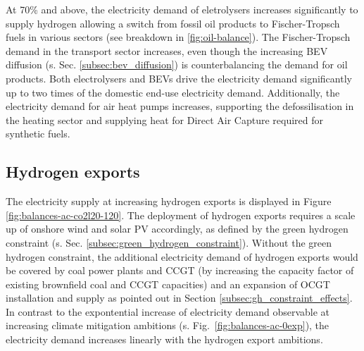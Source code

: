 At 70\% and above, the electricity demand of eletrolysers increases significantly to supply hydrogen allowing a switch from fossil oil products to Fischer-Tropsch fuels in various sectors (see breakdown in \ref{fig:oil-balance}). 
The Fischer-Tropsch demand in the transport sector increases, even though the increasing BEV diffusion (s. Sec. \ref{subsec:bev_diffusion}) is counterbalancing the demand for oil products. 
Both electrolysers and BEVs drive the electricity demand significantly up to two times of the domestic end-use electricity demand. 
Additionally, the electricity demand for air heat pumps increases, supporting the defossilisation in the heating sector and supplying heat for Direct Air Capture required for synthetic fuels.



\subsection{Hydrogen exports}
\label{subsec:increase_h2}

The electricity supply at increasing hydrogen exports is displayed in Figure \ref{fig:balances-ac-co2l20-120}. The deployment of hydrogen exports requires a scale up of onshore wind and solar PV accordingly, as defined by the green hydrogen constraint (s. Sec. \ref{subsec:green_hydrogen_constraint}).
Without the green hydrogen constraint, the additional electricity demand of hydrogen exports would be covered by coal power plants and CCGT (by increasing the capacity factor of existing brownfield coal and CCGT capacities) and an expansion of OCGT installation and supply as pointed out in Section \ref{subsec:gh_constraint_effects}.
In contrast to the expontential increase of electricity demand observable at increasing climate mitigation ambitions (s. Fig.~\ref{fig:balances-ac-0exp}), the electricity demand increases linearly with the hydrogen export ambitions.


